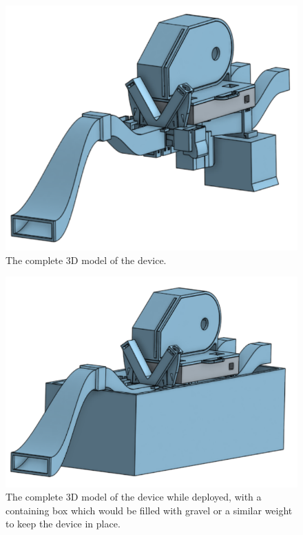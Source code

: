 \documentclass[fleqn,10pt]{SelfArx} %
\begin{document}
	\begin{figure}[h]
		\centering
		\includegraphics[width=1\linewidth]{Figures/CADFull}
		\caption[Complete 3D Model]{The complete 3D model of the device.}
		\label{fig:FullCAD}
	\end{figure}
	\begin{figure}[h]
		\centering
		\includegraphics[width=1\linewidth]{Figures/CADFullBox}
		\caption[Deployed 3D Model]{The complete 3D model of the device while deployed, with a containing box which would be filled with gravel or a similar weight to keep the device in place.}
		\label{fig:FullCADBox}
	\end{figure}
\end{document}
